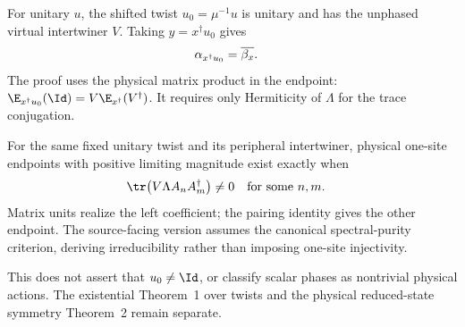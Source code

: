 \begin{lemma}
    \label{lem:physical_string_endpoint_pairing}
    \leanok
    For unitary $u$, the shifted twist $u_0=\mu^{-1}u$ is unitary and
    has the unphased virtual intertwiner $V$.  Taking
    $y=x^\dagger u_0$ gives
    \begin{align}
        \alpha_{x^\dagger u_0} & =\overline{\beta_x}.
        \notag
    \end{align}
    The proof uses the physical matrix product in the endpoint:
    $\E_{x^\dagger u_0}(\Id)=V\E_{x^\dagger}(V^\dagger)$.
    It requires only Hermiticity of $\Lambda$ for the trace conjugation.
\end{lemma}

\begin{lemma}
    \label{thm:physical_string_fixed_twist_letter_criterion}
    \leanok
    For the same fixed unitary twist and its peripheral intertwiner,
    physical one-site endpoints with positive limiting magnitude exist
    exactly when
    \begin{align}
        \tr\!\left(V\Lambda A_nA_m^\dagger\right) & \ne0
        \quad\text{for some }n,m.
        \notag
    \end{align}
    Matrix units realize the left coefficient; the pairing identity
    gives the other endpoint.  The source-facing version assumes the
    canonical spectral-purity criterion, deriving irreducibility rather
    than imposing one-site injectivity.

    This does not assert that $u_0\ne\Id$, or classify scalar phases as
    nontrivial physical actions.  The existential Theorem~1 over twists
    and the physical reduced-state symmetry Theorem~2 remain separate.
\end{lemma}

